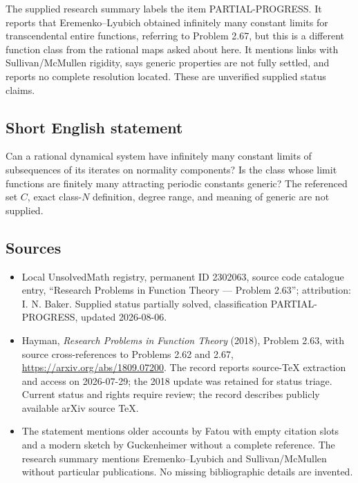 \documentclass[11pt]{article}
\begin{document}
The supplied research summary labels the item PARTIAL-PROGRESS. It reports that Eremenko--Lyubich obtained infinitely many constant limits for transcendental entire functions, referring to Problem 2.67, but this is a different function class from the rational maps asked about here. It mentions links with Sullivan/McMullen rigidity, says generic properties are not fully settled, and reports no complete resolution located. These are unverified supplied status claims.
\subsection{Short English statement}
Can a rational dynamical system have infinitely many constant limits of subsequences of its iterates on normality components? Is the class whose limit functions are finitely many attracting periodic constants generic? The referenced set $C$, exact class-$N$ definition, degree range, and meaning of generic are not supplied.
\subsection{Sources}
\begin{itemize}
\item Local UnsolvedMath registry, permanent ID 2302063, source code catalogue entry, ``Research Problems in Function Theory --- Problem 2.63''; attribution: I. N. Baker. Supplied status partially solved, classification PARTIAL-PROGRESS, updated 2026-08-06.
\item Hayman, \emph{Research Problems in Function Theory} (2018), Problem 2.63, with source cross-references to Problems 2.62 and 2.67, \url{https://arxiv.org/abs/1809.07200}. The record reports source-TeX extraction and access on 2026-07-29; the 2018 update was retained for status triage. Current status and rights require review; the record describes publicly available arXiv source TeX.
\item The statement mentions older accounts by Fatou with empty citation slots and a modern sketch by Guckenheimer without a complete reference. The research summary mentions Eremenko--Lyubich and Sullivan/McMullen without particular publications. No missing bibliographic details are invented.
\end{itemize}
\end{document}
